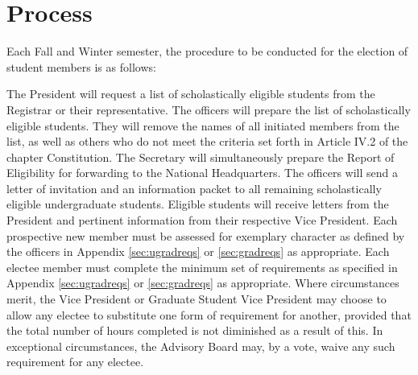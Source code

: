 \section{Process}
Each Fall and Winter semester, the procedure to be conducted for the election of student members is as follows:
\begin{enumsubsection}
\itemnotoc The President will request a list of scholastically eligible students from the Registrar or their representative.
\itemnotoc The officers will prepare the list of scholastically eligible students.
They will remove the names of all initiated members from the list, as well as others who do not meet the criteria set forth in Article IV.2 of the chapter Constitution.
The Secretary will simultaneously prepare the Report of Eligibility for forwarding to the National Headquarters.
\itemnotoc The officers will send a letter of invitation and an information packet to all remaining scholastically eligible undergraduate students.
\itemnotoc Eligible students will receive letters from the President and pertinent information from their respective Vice President.
\itemnotoc Each prospective new member must be assessed for exemplary character as defined by the officers in Appendix \ref{sec:ugradreqs} or \ref{sec:gradreqs} as appropriate.
\itemnotoc Each electee member must complete the minimum set of requirements as specified in Appendix \ref{sec:ugradreqs} or \ref{sec:gradreqs} as appropriate.
Where circumstances merit, the Vice President or Graduate Student Vice President may choose to allow any electee to substitute one form of requirement for another, provided that the total number of hours completed is not diminished as a result of this.
In exceptional circumstances, the Advisory Board may, by a  vote, waive any such requirement for any electee.


\end{enumsubsection}
